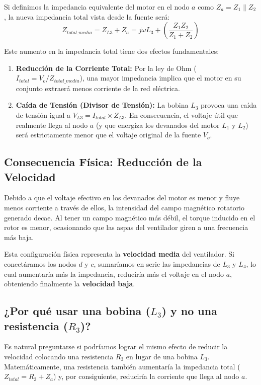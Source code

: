 \documentclass[12pt, a4paper]{article}
\begin{document}
Si definimos la impedancia equivalente del motor en el nodo $a$ como $Z_a = Z_1 \parallel Z_2$, la nueva impedancia total vista desde la fuente será:
\begin{equation}
    Z_{total\_media} = Z_{L3} + Z_a = j\omega L_3 + \left( \frac{Z_1 Z_2}{Z_1 + Z_2} \right)
\end{equation}

Este aumento en la impedancia total tiene dos efectos fundamentales:
\begin{enumerate}
    \item \textbf{Reducción de la Corriente Total:} Por la ley de Ohm ($I_{total} = V_o / Z_{total\_media}$), una mayor impedancia implica que el motor en su conjunto extraerá menos corriente de la red eléctrica.
    \item \textbf{Caída de Tensión (Divisor de Tensión):} La bobina $L_3$ provoca una caída de tensión igual a $V_{L3} = I_{total} \times Z_{L3}$. En consecuencia, el voltaje útil que realmente llega al nodo $a$ (y que energiza los devanados del motor $L_1$ y $L_2$) será estrictamente menor que el voltaje original de la fuente $V_o$.
\end{enumerate}

\subsection*{Consecuencia Física: Reducción de la Velocidad}
Debido a que el voltaje efectivo en los devanados del motor es menor y fluye menos corriente a través de ellos, la intensidad del campo magnético rotatorio generado decae. Al tener un campo magnético más débil, el torque inducido en el rotor es menor, ocasionando que las aspas del ventilador giren a una frecuencia más baja. 

Esta configuración física representa la \textbf{velocidad media} del ventilador. Si conectáramos los nodos $d$ y $c$, sumaríamos en serie las impedancias de $L_3$ y $L_4$, lo cual aumentaría más la impedancia, reduciría más el voltaje en el nodo $a$, obteniendo finalmente la \textbf{velocidad baja}.

\subsection*{¿Por qué usar una bobina ($L_3$) y no una resistencia ($R_3$)?}
Es natural preguntarse si podríamos lograr el mismo efecto de reducir la velocidad colocando una resistencia $R_3$ en lugar de una bobina $L_3$. Matemáticamente, una resistencia también aumentaría la impedancia total ($Z_{total} = R_3 + Z_a$) y, por consiguiente, reduciría la corriente que llega al nodo $a$. 
\end{document}
